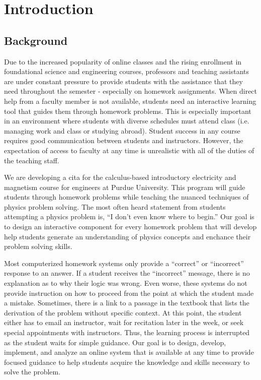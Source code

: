 \chapter[Introduction]{Introduction}

\section{Background}

Due to the increased popularity of online classes and the rising enrollment in foundational science and engineering courses, professors and teaching assistants are under constant pressure to provide students with the assistance that they need throughout the semester - especially on homework assignments. When direct help from a faculty member is not available, students need an interactive learning tool that guides them through homework problems. This is especially important in an environment where students with diverse schedules must attend class (i.e. managing work and class or studying abroad). Student success in any course requires good communication between students and instructors. However, the expectation of access to faculty at any time is unrealistic with all of the duties of the teaching staff.

We are developing a \gls{cita} for the calculus-based introductory electricity and magnetism course for engineers at Purdue University. This program will guide students through homework problems while teaching the nuanced techniques of physics problem solving. The most often heard statement from students attempting a physics problem is, ``I don’t even know where to begin.'' Our goal is to design an interactive component for every homework problem that will develop help students generate an understanding of physics concepts and enchance their problem solving skills.

Most computerized homework systems only provide a ``correct'' or ``incorrect'' response to an answer. If a student receives the ``incorrect'' message, there is no explanation as to why their logic was wrong. Even worse, these systems do not provide instruction on how to proceed from the point at which the student made a mistake. Sometimes, there is a link to a passage in the textbook that lists the derivation of the problem without specific context. At this point, the student either has to email an instructor, wait for recitation later in the week, or seek special appointments with instructors. Thus, the learning process is interrupted as the student waits for simple guidance. Our goal is to design, develop, implement, and analyze an online system that is available at any time to provide focused guidance to help students acquire the knowledge and skills necessary to solve the problem.

